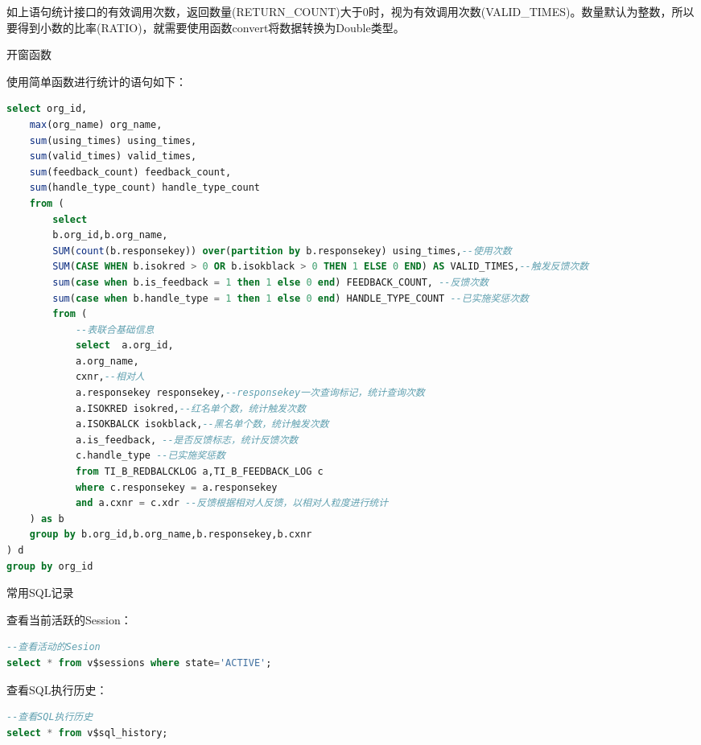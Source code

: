 \documentclass[12pt]{book}
\makeatletter
\numberwithin{dummy}{section}
\theoremstyle{ocrenumbox}
\theoremstyle{blacknumex}
\theoremstyle{blacknumbox}
\theoremstyle{ocrenum}
\renewcommand{\subsection}{\@startsection {subsection}{2}{\z@}
	{-3ex \@plus -0.1ex \@minus -.4ex}
	{0.5ex \@plus.2ex }
	{\normalfont\sffamily\bfseries}}
\renewcommand\paragraph{\@startsection{paragraph}{4}{\z@}
	{-2ex \@plus-.2ex \@minus .2ex}
	{.1ex}
	{\normalfont\small\sffamily\bfseries}}
\newlength\esp
\makeatother
\begin{document}
如上语句统计接口的有效调用次数，返回数量(RETURN\_COUNT)大于0时，视为有效调用次数(VALID\_TIMES)。数量默认为整数，所以要得到小数的比率(RATIO)，就需要使用函数convert将数据转换为Double类型。

\paragraph{开窗函数}

使用简单函数进行统计的语句如下：

\begin{lstlisting}[language=SQL]
select org_id,
	max(org_name) org_name,
	sum(using_times) using_times,
	sum(valid_times) valid_times,
	sum(feedback_count) feedback_count,
	sum(handle_type_count) handle_type_count
	from (
		select 
		b.org_id,b.org_name,
		SUM(count(b.responsekey)) over(partition by b.responsekey) using_times,--使用次数
		SUM(CASE WHEN b.isokred > 0 OR b.isokblack > 0 THEN 1 ELSE 0 END) AS VALID_TIMES,--触发反馈次数
		sum(case when b.is_feedback = 1 then 1 else 0 end) FEEDBACK_COUNT, --反馈次数
		sum(case when b.handle_type = 1 then 1 else 0 end) HANDLE_TYPE_COUNT --已实施奖惩次数
		from (
			--表联合基础信息
			select  a.org_id,
			a.org_name,
			cxnr,--相对人
			a.responsekey responsekey,--responsekey一次查询标记，统计查询次数
			a.ISOKRED isokred,--红名单个数，统计触发次数
			a.ISOKBALCK isokblack,--黑名单个数，统计触发次数
			a.is_feedback, --是否反馈标志，统计反馈次数
			c.handle_type --已实施奖惩数
			from TI_B_REDBALCKLOG a,TI_B_FEEDBACK_LOG c
			where c.responsekey = a.responsekey
			and a.cxnr = c.xdr --反馈根据相对人反馈，以相对人粒度进行统计
	) as b
	group by b.org_id,b.org_name,b.responsekey,b.cxnr
) d
group by org_id
\end{lstlisting}



\subsection{常用SQL记录}

查看当前活跃的Session：

\begin{lstlisting}[language=SQL]
--查看活动的Sesion
select * from v$sessions where state='ACTIVE';
\end{lstlisting}

查看SQL执行历史：

\begin{lstlisting}[language=SQL]
--查看SQL执行历史
select * from v$sql_history;
\end{lstlisting}
\end{document}
